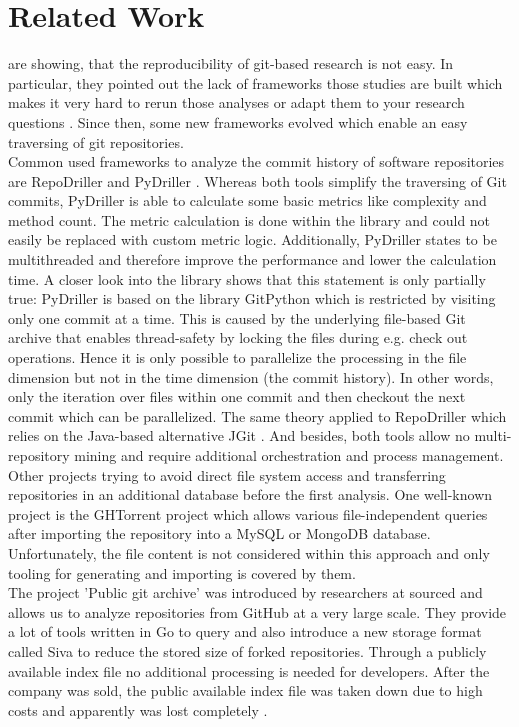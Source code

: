 \documentclass[conference]{IEEEtran}
\begin{document}
\section{Related Work}
 are showing, that the reproducibility of git-based research is not easy. In particular, they pointed out the lack of frameworks those studies are built which makes it very hard to rerun those analyses or adapt them to your research questions \cite{Robles2010}. Since then, some new frameworks evolved which enable an easy traversing of git repositories.\\
Common used frameworks to analyze the commit history of software repositories are RepoDriller \cite{repodriller} and PyDriller \cite{pydriller,Spadini2018}. Whereas both tools simplify the traversing of Git commits, PyDriller is able to calculate some basic metrics like complexity and method count. The metric calculation is done within the library and could not easily be replaced with custom metric logic. Additionally, PyDriller states to be multithreaded and therefore improve the performance and lower the calculation time. A closer look into the library shows that this statement is only partially true: PyDriller is based on the library GitPython which is restricted by visiting only one commit at a time. This is caused by the underlying file-based Git archive that enables thread-safety by locking the files during e.g. check out operations. Hence it is only possible to parallelize the processing in the file dimension but not in the time dimension (the commit history). In other words, only the iteration over files within one commit and then checkout the next commit which can be parallelized. The same theory applied to RepoDriller which relies on the Java-based alternative JGit \cite{jgit}. And besides, both tools allow no multi-repository mining and require additional orchestration and process management.\\
Other projects trying to avoid direct file system access and transferring repositories in an additional database before the first analysis. One well-known project is the GHTorrent project \cite{Gousios2012, Gousios2015} which allows various file-independent queries after importing the repository into a MySQL or MongoDB database. Unfortunately, the file content is not considered within this approach and only tooling for generating and importing is covered by them. \\
The project 'Public git archive' was introduced by researchers at sourced and allows us to analyze repositories from GitHub at a very large scale. They provide a lot of tools written in Go to query and also introduce a new storage format called Siva to reduce the stored size of forked repositories. Through a publicly available index file no additional processing is needed for developers. After the company was sold, the public available index file was taken down due to high costs and apparently was lost completely \cite{srcdissue}.
\end{document}
